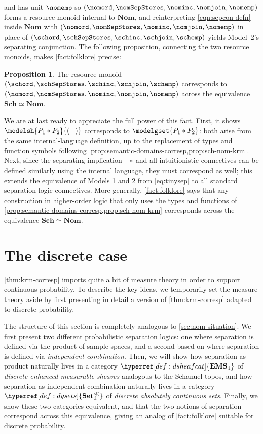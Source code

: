 \documentclass[
  sigconf,
  screen, ]{acmart}
\theoremstyle{definition}
\newtheorem{proposition}[theorem]{Proposition}
\newcommand\nref[2]{\hyperref[#1]{#2}} \newcommand\checkhigh{{\huge{\color{red}\textbf{TODO: check}}}}
\newcommand\texagoodname{absolutely continuous set}
\newcommand\dagoodname{discrete \texagoodname{}}
\newcommand\agoodnamecat{\mathbf{Set}^\ll}
\newcommand\sheafcatadj{enhanced measurable}
\newcommand\goodsheafcat{\mathbf{EMS}}
\newcommand\dgoodsheaves{discrete \sheafcatadj{} sheaves}
\newcommand\Sch{{\nref{def:Sch}{\mathbf{Sch}}}}
\newcommand\Nom{{\nref{def:Nom}{\mathbf{Nom}}}}
\newcommand\sepcon{\mathbin{*}}
\newcommand\sepimp{\mathbin{-\mkern-2mu*}}
\newcommand\discsubscript{_{\rm d}}
\newcommand\dgsets{{\nref{def:dgsets}{\agoodnamecat\discsubscript}}}
\newcommand\dsheafcat{{\nref{def:dsheafcat}{\goodsheafcat\discsubscript}}}
\begin{document}
  and has unit $\nomemp$
  so $(\nomord,\nomSepStores,\nominc,\nomjoin,\nomemp)$ forms a resource monoid internal to $\Nom$,
and reinterpreting
\cref{eqn:sepcon-defn}
inside $\Nom$
with $(\nomord,\nomSepStores,\nominc,\nomjoin,\nomemp)$
in place of
$(\schord,\schSepStores,\schinc,\schjoin,\schemp)$
yields Model~2's separating conjunction.
The following proposition, connecting the two resource monoids,
makes \cref{fact:folklore} precise:
\begin{proposition} \label{prop:sch-nom-krm}
The resource monoid $(\schord,\schSepStores,\schinc,\schjoin,\schemp)$
corresponds to $(\nomord,\nomSepStores,\nominc,\nomjoin,\nomemp)$
across the equivalence $\Sch\simeq\Nom$.
\end{proposition}
We are at last ready to appreciate the full power of this fact.
First, it shows $\modelsh{P_1\sepcon P_2}{(-)}$
corresponds to $\modelgset{P_1\sepcon P_2}$:
both arise from the same internal-language definition,
up to the replacement of types and
function symbols
following \cref{prop:semantic-domains-corresp,prop:sch-nom-krm}.
Next, since the separating implication $\sepimp$
and all intuitionistic connectives can be defined
similarly using the internal language,
they must correspond as well; this extends the equivalence
of Models 1 and 2 from \ref{eq:tinysep}
to all standard separation logic connectives.
More generally, \cref{fact:folklore} says
that any construction in higher-order logic
that only uses the types and functions of
\cref{prop:semantic-domains-corresp,prop:sch-nom-krm}
corresponds across the equivalence $\Sch\simeq\Nom$.

\section{The discrete case} \label{sec:discrete}

\cref{thm:krm-corresp}
imports quite a bit of measure theory
in order to support continuous probability.
To describe the key ideas, we
temporarily set the measure theory aside
by first presenting in detail a version of
\cref{thm:krm-corresp}
adapted to discrete probability.

The structure of this section is completely analogous
to \cref{sec:nom-situation}.
We first present two different
probabilistic separation logics:
one
where separation is defined via the product
of sample spaces,
and a second based on \citet{li2023lilac}
where separation is defined via \emph{independent combination}.
Then, we will show how separation-as-product
naturally lives in a category $\dsheafcat$
of \emph{\dgoodsheaves{}} analogous to the Schanuel topos,
and how separation-as-independent-combination
naturally lives in a category $\dgsets$ of \emph{\dagoodname{s}}.
Finally, we show these two categories equivalent,
and that the two notions of separation correspond
across this equivalence, giving an analog of \cref{fact:folklore}
suitable for discrete probability.
\end{document}
